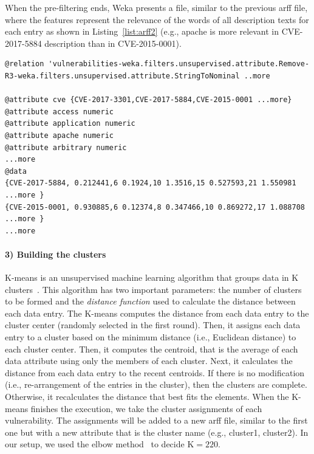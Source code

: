 When the pre-filtering ends, Weka presents a file, similar to the previous \gls{arff} file, where the features represent the relevance of the words of all description texts for each entry as shown in Listing~\ref{list:arff2} (e.g., apache is more relevant in CVE-2017-5884 description than in CVE-2015-0001). 

\begin{lstlisting}[style=mystyle,caption=ARFF file after data preparation.,label=list:arff2]
@relation 'vulnerabilities-weka.filters.unsupervised.attribute.Remove-R3-weka.filters.unsupervised.attribute.StringToNominal ..more

@attribute cve {CVE-2017-3301,CVE-2017-5884,CVE-2015-0001 ...more}
@attribute access numeric
@attribute application numeric
@attribute apache numeric
@attribute arbitrary numeric
...more 
@data
{CVE-2017-5884, 0.212441,6 0.1924,10 1.3516,15 0.527593,21 1.550981  ...more }
{CVE-2015-0001, 0.930885,6 0.12374,8 0.347466,10 0.869272,17 1.088708 ...more }
...more
\end{lstlisting}




\paragraph{3) Building the clusters}
K-means is an unsupervised machine learning algorithm that groups data in K clusters~\cite{Jain:2010}.
This algorithm has two important parameters: the number of clusters to be formed and the \emph{distance function} used to calculate the distance between each data entry.
The K-means computes the distance from each data entry to the cluster center (randomly selected in the first round).
Then, it assigns each data entry to a cluster based on the minimum distance (i.e., Euclidean distance) to each cluster center.
Then, it computes the centroid, that is the average of each data attribute using only the members of each cluster.
Next, it calculates the distance from each data entry to the recent centroids. 
If there is no modification (i.e., re-arrangement of the entries in the cluster), then the clusters are complete. 
Otherwise, it recalculates the distance that best fits the elements. 
When the K-means finishes the execution, we take the cluster assignments of each vulnerability. 
The assignments will be added to a new \gls{arff} file, similar to the first one but with a new attribute that is the cluster name (e.g., cluster1, cluster2). 
In our setup, we used the elbow method~\cite{Thorndike:1953} to decide K$=220$.



